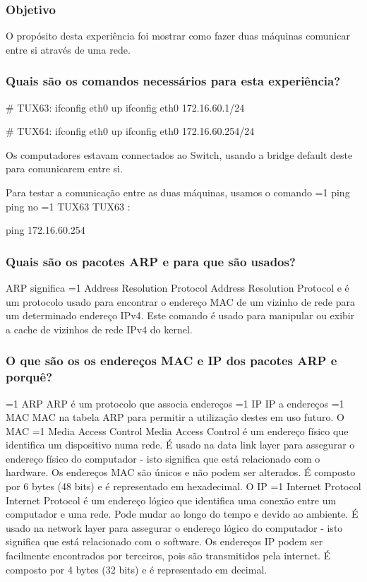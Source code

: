 \documentclass[11pt,a4paper,twocolumn]{article}
\newcommand{\hl}[2][1]{%
  \ifnum#1=1\relax
    \textcolor{text-hl1}{#2}%
  \else
    \textcolor{text-hl2}{#2}%
  \fi
}
\begin{document}
\subsubsection{Objetivo}

O propósito desta experiência foi mostrar como fazer duas máquinas comunicar entre si através de uma rede.

\subsubsection{Quais são os comandos necessários para esta experiência?}

\begin{bash-darktheme}
    # TUX63:
    ifconfig eth0 up
    ifconfig eth0 172.16.60.1/24

    # TUX64:
    ifconfig eth0 up
    ifconfig eth0 172.16.60.254/24
\end{bash-darktheme}
 
Os computadores estavam connectados ao Switch, usando a bridge default deste para comunicarem entre si. 

Para testar a comunicação entre as duas máquinas, usamos o comando \hl{ping} no \hl{TUX63}: 

\begin{bash-darktheme}
    ping 172.16.60.254
\end{bash-darktheme}

\subsubsection{Quais são os pacotes ARP e para que são usados?}

ARP significa \hl{Address Resolution Protocol} e é um protocolo usado para encontrar o endereço MAC de um vizinho de rede para um determinado endereço IPv4. Este comando é usado para manipular ou exibir a cache de vizinhos de rede IPv4 do kernel.

\subsubsection{O que são os os endereços MAC e IP dos pacotes ARP e porquê?}

\hl{ARP} é um protocolo que associa endereços \hl{IP} a endereços \hl{MAC} na tabela ARP para permitir a utilização destes em uso futuro.
O MAC \hl{Media Access Control} é um endereço físico que identifica um dispositivo numa rede. É usado na data link layer para assegurar o endereço físico do computador - isto significa que está relacionado com o hardware. Os endereços MAC são únicos e não podem ser alterados. É composto por 6 bytes (48 bits) e é representado em hexadecimal.
O IP \hl{Internet Protocol} é um endereço lógico que identifica uma conexão entre um computador e uma rede. Pode mudar ao longo do tempo e devido ao ambiente. É usado na network layer para assegurar o endereço lógico do computador - isto significa que está relacionado com o software. Os endereços IP podem ser facilmente encontrados por terceiros, pois são transmitidos pela internet. É composto por 4 bytes (32 bits) e é representado em decimal.
\end{document}
